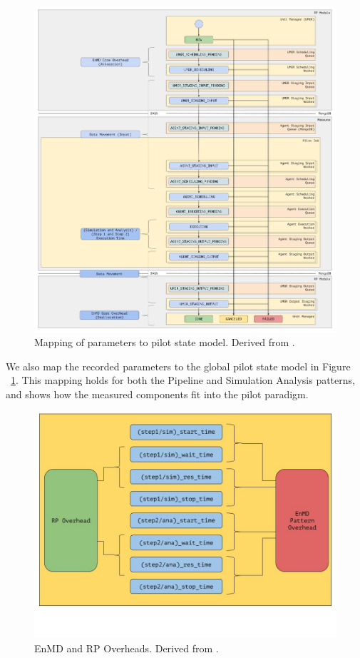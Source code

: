 \documentclass[]{article}
\begin{document}
		\begin{figure}[H]
			\centering
			\includegraphics[scale=.15]{diagrams/enmd_state_model_mapping.jpg}
			\caption{Mapping of parameters to pilot state model. Derived from \cite{rp_state_diagram}.}
			\label{fig:param_pilot_state_mapping}
		\end{figure}
		We also map the recorded parameters to the global pilot state model in Figure ~\ref{fig:param_pilot_state_mapping}. This mapping holds for both the Pipeline and Simulation Analysis patterns, and shows how the measured components fit into the pilot paradigm.
		\begin{figure}[H]
			\centering
			\includegraphics[scale=.3]{diagrams/pattern_and_rp_overheads.jpg}
			\caption{EnMD and RP Overheads. Derived from \cite{rp_state_diagram}.}
			\label{fig:pattern_rp_overheads}
		\end{figure}
\end{document}
